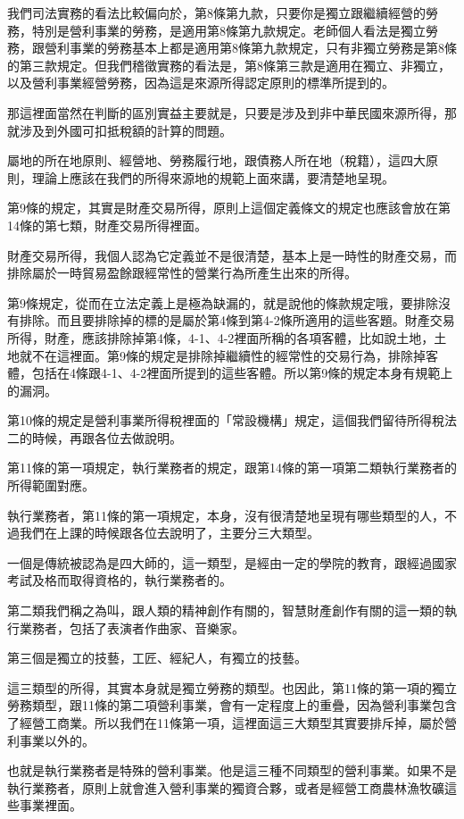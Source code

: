\documentclass[oneside,sub3section]{ctexbook}
\begin{document}
我們司法實務的看法比較偏向於，第8條第九款，只要你是獨立跟繼續經營的勞務，特別是營利事業的勞務，是適用第8條第九款規定。老師個人看法是獨立勞務，跟營利事業的勞務基本上都是適用第8條第九款規定，只有非獨立勞務是第8條的第三款規定。但我們稽徵實務的看法是，第8條第三款是適用在獨立、非獨立，以及營利事業經營勞務，因為這是來源所得認定原則的標準所提到的。

那這裡面當然在判斷的區別實益主要就是，只要是涉及到非中華民國來源所得，那就涉及到外國可扣抵稅額的計算的問題。

屬地的所在地原則、經營地、勞務履行地，跟債務人所在地（稅籍），這四大原則，理論上應該在我們的所得來源地的規範上面來講，要清楚地呈現。

第9條的規定，其實是財產交易所得，原則上這個定義條文的規定也應該會放在第14條的第七類，財產交易所得裡面。

財產交易所得，我個人認為它定義並不是很清楚，基本上是一時性的財產交易，而排除屬於一時貿易盈餘跟經常性的營業行為所產生出來的所得。

第9條規定，從而在立法定義上是極為缺漏的，就是說他的條款規定哦，要排除沒有排除。而且要排除掉的標的是屬於第4條到第4-2條所適用的這些客題。財產交易所得，財產，應該排除掉第4條，4-1、4-2裡面所稱的各項客體，比如說土地，土地就不在這裡面。第9條的規定是排除掉繼續性的經常性的交易行為，排除掉客體，包括在4條跟4-1、4-2裡面所提到的這些客體。所以第9條的規定本身有規範上的漏洞。

第10條的規定是營利事業所得稅裡面的「常設機構」規定，這個我們留待所得稅法二的時候，再跟各位去做說明。

第11條的第一項規定，執行業務者的規定，跟第14條的第一項第二類執行業務者的所得範圍對應。

執行業務者，第11條的第一項規定，本身，沒有很清楚地呈現有哪些類型的人，不過我們在上課的時候跟各位去說明了，主要分三大類型。

一個是傳統被認為是四大師的，這一類型，是經由一定的學院的教育，跟經過國家考試及格而取得資格的，執行業務者的。

第二類我們稱之為叫，跟人類的精神創作有關的，智慧財產創作有關的這一類的執行業務者，包括了表演者作曲家、音樂家。

第三個是獨立的技藝，工匠、經紀人，有獨立的技藝。

這三類型的所得，其實本身就是獨立勞務的類型。也因此，第11條的第一項的獨立勞務類型，跟11條的第二項營利事業，會有一定程度上的重疊，因為營利事業包含了經營工商業。所以我們在11條第一項，這裡面這三大類型其實要排斥掉，屬於營利事業以外的。

也就是執行業務者是特殊的營利事業。他是這三種不同類型的營利事業。如果不是執行業務者，原則上就會進入營利事業的獨資合夥，或者是經營工商農林漁牧礦這些事業裡面。
\end{document}
